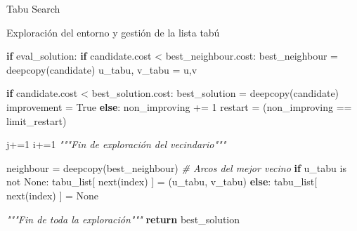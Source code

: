 \documentclass[ignorenonframetext,]{beamer}
\newenvironment{Shaded}{}{}
\newcommand{\KeywordTok}[1]{\textcolor[rgb]{0.00,0.44,0.13}{\textbf{{#1}}}}
\newcommand{\DataTypeTok}[1]{\textcolor[rgb]{0.56,0.13,0.00}{{#1}}}
\newcommand{\DecValTok}[1]{\textcolor[rgb]{0.25,0.63,0.44}{{#1}}}
\newcommand{\CommentTok}[1]{\textcolor[rgb]{0.38,0.63,0.69}{\textit{{#1}}}}
\newcommand{\OtherTok}[1]{\textcolor[rgb]{0.00,0.44,0.13}{{#1}}}
\newcommand{\NormalTok}[1]{{#1}}
\begin{document}
\begin{frame}[fragile]{Tabu Search}

\begin{block}{Exploración del entorno y gestión de la lista tabú}

\begin{Shaded}
\begin{Highlighting}[]
            \KeywordTok{if} \NormalTok{eval_solution:                                       }
                \KeywordTok{if} \NormalTok{candidate.cost < best_neighbour.cost:}
                    \NormalTok{best_neighbour = deepcopy(candidate)}
                    \NormalTok{u_tabu, v_tabu = u,v     }

                    \KeywordTok{if} \NormalTok{candidate.cost < best_solution.cost:}
                        \NormalTok{best_solution = deepcopy(candidate)                      }
                        \NormalTok{improvement = }\OtherTok{True}
                \KeywordTok{else}\NormalTok{:}
                    \NormalTok{non_improving += }\DecValTok{1}
                    \NormalTok{restart = (non_improving == limit_restart)          }

            \NormalTok{j+=}\DecValTok{1}
            \NormalTok{i+=}\DecValTok{1}
        \CommentTok{"""Fin de exploración del vecindario"""}

        \NormalTok{neighbour = deepcopy(best_neighbour)}
        \CommentTok{# Arcos del mejor vecino}
        \KeywordTok{if} \NormalTok{u_tabu is not }\OtherTok{None}\NormalTok{:}
            \NormalTok{tabu_list[ }\DataTypeTok{next}\NormalTok{(index) ] = (u_tabu, v_tabu)}
        \KeywordTok{else}\NormalTok{:}
            \NormalTok{tabu_list[ }\DataTypeTok{next}\NormalTok{(index) ] = }\OtherTok{None}

    \CommentTok{"""Fin de toda la exploración"""}
    \KeywordTok{return} \NormalTok{best_solution}
\end{Highlighting}
\end{Shaded}

\end{block}

\end{frame}
\end{document}
